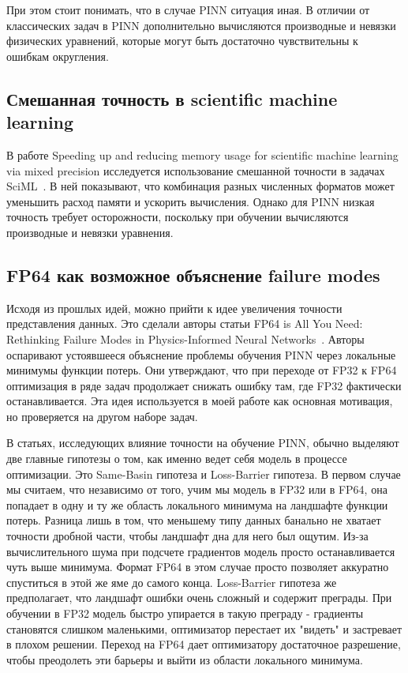 \documentclass[14pt,a4paper]{extarticle}
\begin{document}
При этом стоит понимать, что в случае PINN ситуация иная. В отличии от классических задач в PINN дополнительно вычисляются производные и невязки физических уравнений, которые могут быть достаточно чувствительны к ошибкам округления.


\subsection{Смешанная точность в scientific machine learning}

В работе Speeding up and reducing memory usage for scientific machine learning via mixed precision исследуется использование смешанной точности в задачах SciML~\cite{hayford2024mixed}. В ней показывают, что комбинация разных численных форматов может уменьшить расход памяти и ускорить вычисления. Однако для PINN низкая точность требует осторожности, поскольку при обучении вычисляются производные и невязки уравнения.

\subsection{FP64 как возможное объяснение failure modes}

Исходя из прошлых идей, можно прийти к идее увеличения точности представления данных. Это сделали авторы статьи FP64 is All You Need: Rethinking Failure Modes in Physics-Informed Neural Networks~\cite{wang2025fp64}. Авторы оспаривают устоявшееся объяснение проблемы обучения PINN через локальные минимумы функции потерь. Они утверждают, что при переходе от FP32 к FP64 оптимизация в ряде задач продолжает снижать ошибку там, где FP32 фактически останавливается. Эта идея используется в моей работе как основная мотивация, но проверяется на другом наборе задач.

В статьях, исследующих влияние точности на обучение PINN, обычно выделяют две главные гипотезы о том, как именно ведет себя модель в процессе оптимизации. Это Same-Basin гипотеза  и Loss-Barrier гипотеза.
В первом случае мы считаем, что независимо от того, учим мы модель в FP32 или в FP64, она попадает в одну и ту же область локального минимума на ландшафте функции потерь. Разница лишь в том, что меньшему типу данных банально не хватает точности дробной части, чтобы ландшафт дна для него был ощутим. Из-за вычислительного шума при подсчете градиентов модель просто останавливается чуть выше минимума. Формат FP64 в этом случае просто позволяет аккуратно спуститься в этой же яме до самого конца.
Loss-Barrier гипотеза же предполагает, что ландшафт ошибки очень сложный и содержит преграды. При обучении в FP32 модель быстро упирается в такую преграду - градиенты становятся слишком маленькими, оптимизатор перестает их "видеть" и застревает в плохом решении. Переход на FP64 дает оптимизатору достаточное разрешение, чтобы преодолеть эти барьеры и выйти из области локального минимума.
\end{document}
